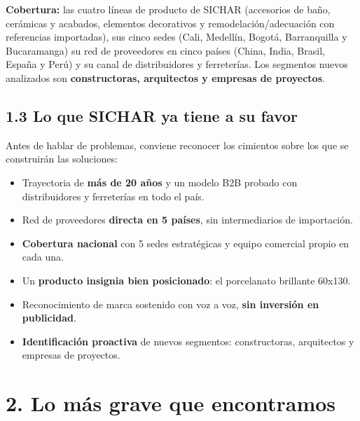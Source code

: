 \documentclass[11pt,a4paper]{article}
\begin{document}
\textbf{Cobertura:} las cuatro líneas de producto de SICHAR (accesorios de baño, cerámicas y
acabados, elementos decorativos y remodelación/adecuación con referencias importadas), sus cinco
sedes (Cali, Medellín, Bogotá, Barranquilla y Bucaramanga) su red de proveedores en cinco países
(China, India, Brasil, España y Perú) y su canal de distribuidores y ferreterías. Los segmentos
nuevos analizados son \textbf{constructoras, arquitectos y empresas de proyectos}.


\hypertarget{lo-que-sichar-ya-tiene-a-su-favor}{%
\subsection{1.3 Lo que SICHAR ya tiene a su favor}\label{lo-que-sichar-ya-tiene-a-su-favor}}

Antes de hablar de problemas, conviene reconocer los cimientos sobre los que se construirán las
soluciones:

\begin{itemize}
\item
  Trayectoria de \textbf{más de 20 años} y un modelo B2B probado con distribuidores y ferreterías en
  todo el país.
\item
  Red de proveedores \textbf{directa en 5 países}, sin intermediarios de importación.
\item
  \textbf{Cobertura nacional} con 5 sedes estratégicas y equipo comercial propio en cada una.
\item
  Un \textbf{producto insignia bien posicionado}: el porcelanato brillante 60x130.
\item
  Reconocimiento de marca sostenido con voz a voz, \textbf{sin inversión en publicidad}.
\item
  \textbf{Identificación proactiva} de nuevos segmentos: constructoras, arquitectos y empresas de
  proyectos.
\end{itemize}

\hypertarget{lo-muxe1s-grave-que-encontramos}{%
\section{2. Lo más grave que encontramos}\label{lo-muxe1s-grave-que-encontramos}}
\end{document}
